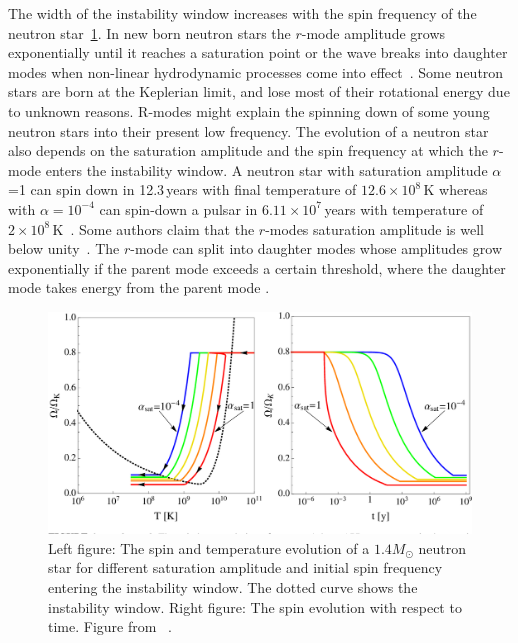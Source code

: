 \documentclass{ttuthes2007}
\begin{document}
The width of the instability window increases with the spin frequency of the
neutron star~\ref{fig:instability}. In new born neutron stars the $r$-mode
amplitude grows exponentially until it reaches a saturation point or the wave
breaks into daughter modes when non-linear hydrodynamic processes come into
effect~\cite{Owen_1998}. Some neutron stars are born at the Keplerian limit, and
lose most of their rotational energy due to unknown reasons. R-modes might
explain the spinning down of some young neutron stars into their present low
frequency. The evolution of a neutron star also depends on the saturation
amplitude and the spin frequency at which the $r$-mode enters the instability
window. A neutron star with saturation amplitude $\alpha$=1 can spin down in
12.3\,years with final temperature of $12.6 \times 10^8\,\mathrm{K}$ whereas
with $\alpha=10^{-4}$ can spin-down a pulsar in $6.11 \times 10^7$\,years with
temperature of $2 \times 10^8\,\mathrm{K}$~\cite{Alford_2014}. Some authors
claim that the $r$-modes saturation amplitude is well below
unity~\cite{Gressman_2002}. The $r$-mode can split into daughter modes whose
amplitudes grow exponentially if the parent mode exceeds a certain threshold,
where the daughter mode takes energy from the parent mode \cite{Arras_2003}.
\begin{figure}[bht!]                                                            
        \includegraphics[width=\textwidth]{figure/rmodesamplitude.png}                         
	\caption{Left figure: The spin and temperature  evolution of a $1.4 M_\odot$ neutron star
for different saturation amplitude and initial spin frequency entering the
instability window. The dotted curve shows the instability window. Right figure:
The spin evolution with respect to time. Figure from ~\cite{Alford_2014}.}
        \label{fig:instability}                                                     
\end{figure}  
\end{document}
